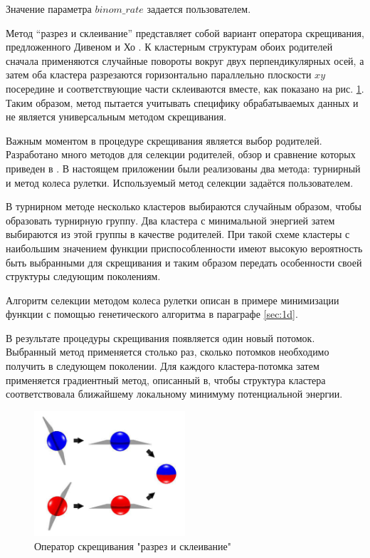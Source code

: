 Значение параметра $binom\_rate$ задается пользователем.

Метод ``разрез и склеивание'' представляет собой вариант оператора скрещивания,
предложенного Дивеном и Хо \cite{Deaven1995}. К кластерным структурам обоих родителей сначала
применяются случайные повороты вокруг двух перпендикулярных осей, а затем оба кластера разрезаются
горизонтально параллельно плоскости $xy$ посередине и соответствующие части склеиваются вместе,
как показано на рис. \ref{cut_and_splice}. Таким образом, метод пытается учитывать специфику
обрабатываемых данных и не является универсальным методом скрещивания.

Важным моментом в процедуре скрещивания является выбор родителей. Разработано много методов для селекции
родителей, обзор и сравнение которых приведен в \cite{Blickle1995}. В настоящем приложении
были реализованы два метода: турнирный и метод колеса рулетки. Используемый метод селекции
задаётся пользователем.

В турнирном методе несколько кластеров выбираются случайным образом, чтобы
образовать турнирную группу. Два кластера с минимальной энергией затем
выбираются из этой группы в качестве родителей. При такой схеме кластеры с
наибольшим значением функции приспособленности имеют высокую вероятность быть
выбранными для скрещивания и таким образом передать особенности своей структуры
следующим поколениям.

Алгоритм селекции методом колеса рулетки описан в примере минимизации функции с помощью
генетического алгоритма в параграфе \ref{sec:1d}.

В результате процедуры скрещивания появляется один новый потомок. Выбранный метод применяется
столько раз, сколько потомков необходимо получить в следующем поколении.
Для каждого кластера-потомка затем применяется градиентный метод, описанный в, %
чтобы структура кластера соответствовала ближайшему локальному минимуму потенциальной энергии.

\begin{figure}[h!]
\centering
  \includegraphics[width=0.5\textwidth]{./FIGs/cut_and_splice.png}
\caption{Оператор скрещивания "разрез и склеивание"}
\label{cut_and_splice}
\end{figure}

